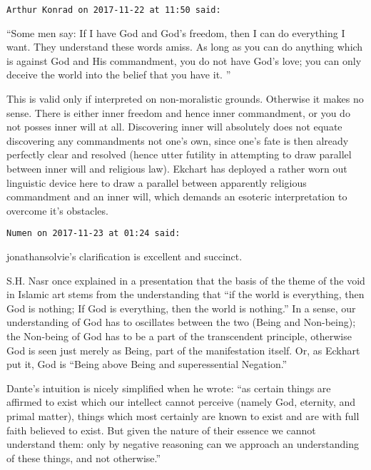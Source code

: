 \begin{footnotesize}
\begin{sffamily}
\texttt{Arthur Konrad on 2017-11-22 at 11:50 said: }

“Some men say: If I have God and God's freedom, then I can do everything I want. They understand these words amiss. As long as you can do anything which is against God and His commandment, you do not have God's love; you can only deceive the world into the belief that you have it. ”

This is valid only if interpreted on non-moralistic grounds. Otherwise it makes no sense. There is either inner freedom and hence inner commandment, or you do not posses inner will at all. Discovering inner will absolutely does not equate discovering any commandments not one's own, since one's fate is then already perfectly clear and resolved (hence utter futility in attempting to draw parallel between inner will and religious law). Ekchart has deployed a rather worn out linguistic device here to draw a parallel between apparently religious commandment and an inner will, which demands an esoteric interpretation to overcome it's obstacles.


\hfill


\hfill

\texttt{Numen on 2017-11-23 at 01:24 said: }

jonathansolvie's clarification is excellent and succinct.

S.H. Nasr once explained in a presentation that the basis of the theme of the void in Islamic art stems from the understanding that “if the world is everything, then God is nothing; If God is everything, then the world is nothing.” In a sense, our understanding of God has to oscillates between the two (Being and Non-being); the Non-being of God has to be a part of the transcendent principle, otherwise God is seen just merely as Being, part of the manifestation itself. Or, as Eckhart put it, God is “Being above Being and superessential Negation.”

Dante's intuition is nicely simplified when he wrote: “as certain things are affirmed to exist which our intellect cannot perceive (namely God, eternity, and primal matter), things which most certainly are known to exist and are with full faith believed to exist. But given the nature of their essence we cannot understand them: only by negative reasoning can we approach an understanding of these things, and not otherwise.”


\end{sffamily}\end{footnotesize}
